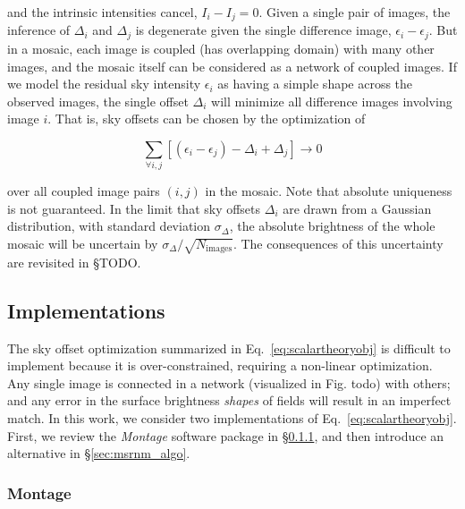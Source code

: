 \documentclass[iop]{emulateapj}
\newcommand{\sw}[1]{\textit{#1}} %
\newcommand{\todo}[1]{\textcolor{RedOrange}{#1}} %
\newcommand{\Eq}[1]{Eq.~\ref{eq:#1}}  %
\newcommand{\Sec}[1]{\S\ref{sec:#1}}  %
\begin{document}
\noindent and the intrinsic intensities cancel, $I_i - I_j = 0$.
Given a single pair of images, the inference of $\Delta_i$ and $\Delta_j$ is degenerate given the single difference image, $\epsilon_i-\epsilon_j$.
But in a mosaic, each image is coupled (has overlapping domain) with many other images, and the mosaic itself can be considered as a network of coupled images.
If we model the residual sky intensity $\epsilon_i$ as having a simple shape across the observed images, the single offset $\Delta_i$ will minimize all difference images involving image $i$.
That is, sky offsets can be chosen by the optimization of

\begin{equation}
    \sum_{\forall i,j} [(\epsilon_i - \epsilon_j) - \Delta_i + \Delta_j] \rightarrow 0
    \label{eq:scalartheoryobj}
\end{equation}

\noindent over all coupled image pairs $(i,j)$ in the mosaic.
Note that absolute uniqueness is not guaranteed.
In the limit that sky offsets $\Delta_i$ are drawn from a Gaussian distribution, with standard deviation $\sigma_\Delta$, the absolute brightness of the whole mosaic will be uncertain by $\sigma_\Delta / \sqrt{N_\mathrm{images}}$.
The consequences of this uncertainty are revisited in \S\todo{TODO}.

\subsection{Implementations}
\label{sec:offset_algos}

The sky offset optimization summarized in \Eq{scalartheoryobj} is difficult to implement because it is over-constrained, requiring a non-linear optimization.
Any single image is connected in a network (visualized in Fig. \todo{todo}) with others; and any error in the surface brightness \emph{shapes} of fields will result in an imperfect match.
In this work, we consider two implementations of \Eq{scalartheoryobj}.
First, we review the \sw{Montage} software package in \Sec{montage_algo}, and then introduce an alternative in \Sec{msrnm_algo}.

\subsubsection{Montage}
\label{sec:montage_algo}
\end{document}
